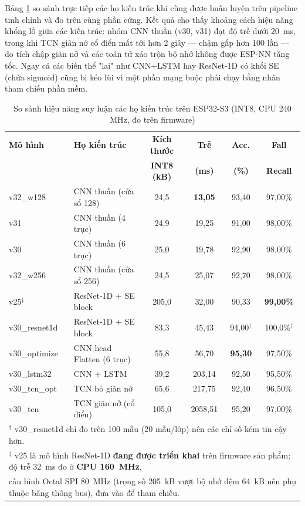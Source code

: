 \documentclass[../DoAn.tex]{subfiles}
\begin{document}
Bảng \ref{tab:mcu_arch_compare} so sánh trực tiếp các họ kiến trúc khi cùng được huấn luyện trên pipeline tinh chỉnh và đo trên cùng phần cứng. Kết quả cho thấy khoảng cách hiệu năng khổng lồ giữa các kiến trúc: nhóm CNN thuần (v30, v31) đạt độ trễ dưới 20~ms, trong khi TCN giãn nở cổ điển mất tới hơn 2 giây --- chậm gấp hơn 100 lần --- do tích chập giãn nở và các toán tử xáo trộn bộ nhớ không được ESP-NN tăng tốc. Ngay cả các biến thể "lai" như CNN+LSTM hay ResNet-1D có khối SE (chứa sigmoid) cũng bị kéo lùi vì một phần mạng buộc phải chạy bằng nhân tham chiếu phần mềm.

\begin{table}[H]
\centering
\caption{So sánh hiệu năng suy luận các họ kiến trúc trên ESP32-S3 (INT8, CPU 240 MHz, đo trên firmware)}
\label{tab:mcu_arch_compare}
\small
\setlength{\tabcolsep}{4pt}
\begin{tabular}{|l|l|c|c|c|c|}
\hline
\textbf{Mô hình} & \textbf{Họ kiến trúc} & \textbf{Kích thước} & \textbf{Trễ} & \textbf{Acc.} & \textbf{Fall} \\
                 &                       & \textbf{INT8 (kB)}  & \textbf{(ms)} & \textbf{(\%)} & \textbf{Recall} \\
\hline
v32\_w128      & CNN thuần (cửa sổ 128)   & 24,5  & \textbf{13,05}   & 93,40 & 97,00\% \\
v31            & CNN thuần (4 trục)       & 24,9  & 19,25            & 91,00 & 98,00\% \\
v30            & CNN thuần (6 trục)       & 25,0  & 19,78            & 92,90 & 98,00\% \\
v32\_w256      & CNN thuần (cửa sổ 256)   & 24,5  & 25,07            & 92,70 & 98,00\% \\
v25$^\ddagger$ & ResNet-1D + SE block     & 205,0 & 32,00            & 90,33 & \textbf{99,00\%} \\
v30\_resnet1d  & ResNet-1D + SE block     & 83,3  & 45,43            & 94,00$^\dagger$ & 100,0\%$^\dagger$ \\
v30\_optimize  & CNN head Flatten (6 trục)& 55,8  & 56,70            & \textbf{95,30} & 97,50\% \\
v30\_lstm32    & CNN + LSTM               & 39,2  & 203,14           & 92,50 & 95,50\% \\
v30\_tcn\_opt  & TCN bỏ giãn nở           & 65,6  & 217,75           & 92,40 & 96,50\% \\
v30\_tcn       & TCN giãn nở (cổ điển)    & 105,0 & 2058,51          & 95,20 & 97,00\% \\
\hline
\multicolumn{6}{|l|}{\footnotesize $^\dagger$ v30\_resnet1d chỉ đo trên 100 mẫu (20 mẫu/lớp) nên các chỉ số kém tin cậy hơn.} \\
\multicolumn{6}{|l|}{\footnotesize $^\ddagger$ v25 là mô hình ResNet-1D \textbf{đang được triển khai} trên firmware sản phẩm; độ trễ 32~ms đo ở \textbf{CPU 160~MHz},} \\
\multicolumn{6}{|l|}{\footnotesize \phantom{$^\ddagger$~}cấu hình Octal SPI 80~MHz (trọng số 205~kB vượt bộ nhớ đệm 64~kB nên phụ thuộc băng thông bus), đưa vào để tham chiếu.} \\
\hline
\end{tabular}
\end{table}
\end{document}
